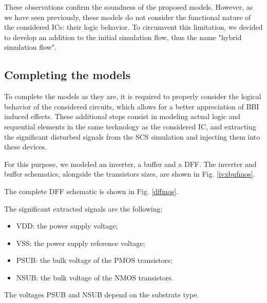 	These observations confirm the soundness of the proposed models.
	However, as we have seen previously, these models do not consider the functional nature of the considered ICs: their logic behavior.
	To circumvent this limitation, we decided to develop an addition to the initial simulation flow, thus the name "hybrid simulation flow".

\subsection{Completing the models}
	To complete the models as they are, it is required to properly consider the logical behavior of the considered circuits, which allows for a better appreciation of BBI induced effects.
	These additional steps consist in modeling actual logic and sequential elements  in the same technology as the considered IC, and extracting the significant disturbed signals from the SCS simulation and injecting them into these devices.
	
	For this purpose, we modeled an inverter, a buffer and a DFF.
	The inverter and buffer schematics, alongside the transistors sizes, are shown in Fig. \ref{ivxbufmos}.
	
	The complete DFF schematic is shown in Fig. \ref{dffmos}.
	
	The significant extracted signals are the following:
	\begin{itemize}
		\item VDD: the power supply voltage;
		\item VSS: the power supply reference voltage;
		\item PSUB: the bulk voltage of the PMOS transistors;
		\item NSUB: the bulk voltage of the NMOS transistors.
	\end{itemize}
	The voltages PSUB and NSUB depend on the substrate type.
